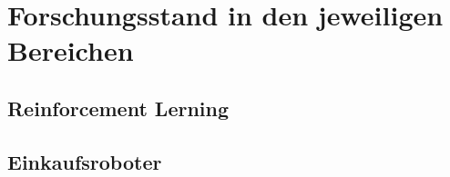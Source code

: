 \newpage
\section{Forschungsstand in den jeweiligen Bereichen}
\subsection{Reinforcement Lerning}
\subsection{Einkaufsroboter}